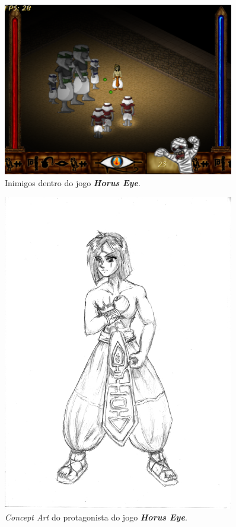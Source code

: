 \documentclass[12pt,onecolumn,a4paper]{article}
\begin{document}
        \begin{figure}[htb]
            \centering
            \includegraphics[width=0.9\textwidth]{images/horus_03.png}
            \caption{Inimigos dentro do jogo \textit{\textbf{Horus Eye}}.}
            \label{fig:horus_03}
        \end{figure}
        
        \clearpage
        
        \begin{figure}[htb]
            \centering
            \includegraphics[width=0.9\textwidth]{images/concept_hero.jpg}
            \caption{\textit{Concept Art} do protagonista do jogo \textit{\textbf{Horus Eye}}.}
            \label{fig:concept_01}
        \end{figure}
        
\end{document}
